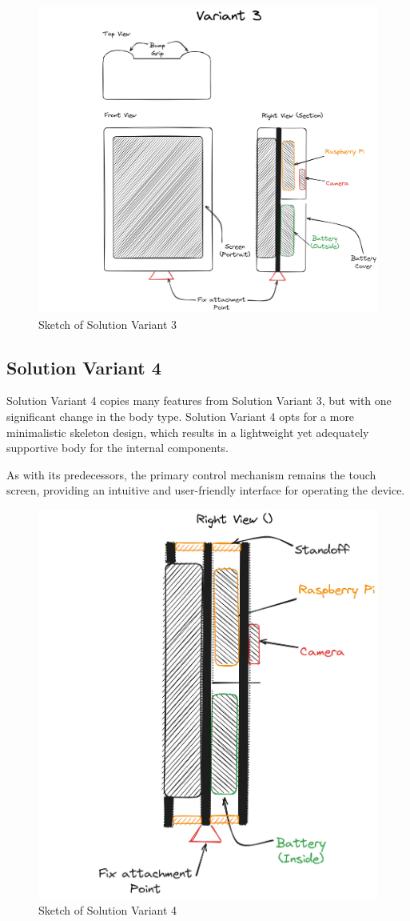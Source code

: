 \begin{figure}[H]
    \centering
    \includegraphics[width=0.75\linewidth]{texs/Part1/chapter3/image/v3.png}
    \caption{Sketch of Solution Variant 3}
    \label{fig:sketch-solution-variant-3}
\end{figure}

\subsection{Solution Variant 4}
Solution Variant 4 copies many features from Solution Variant 3, but with one significant change in the body type. Solution Variant 4 opts for a more minimalistic skeleton design, which results in a lightweight yet adequately supportive body for the internal components.

As with its predecessors, the primary control mechanism remains the touch screen, providing an intuitive and user-friendly interface for operating the device.

\begin{figure}[H]
    \centering
    \includegraphics[width=0.5\linewidth]{texs/Part1/chapter3/image/v4.png}
    \caption{Sketch of Solution Variant 4}
    \label{fig:sketch-solution-variant-4}
\end{figure}

